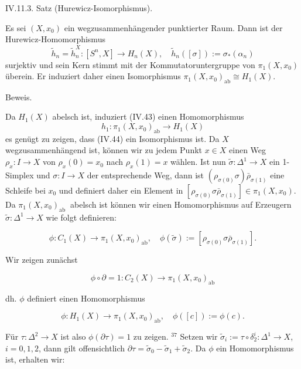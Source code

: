 \documentclass[10pt, letterpaper]{article}
\begin{document}
IV.11.3. Satz (Hurewicz-Isomorphismus). 

Es sei $(X, x_0)$ ein wegzusammenhängender punktierter Raum. Dann ist der Hurewicz-Homomorphismus 
$$\tilde{h}_n=\tilde{h}_n^X:\left[S^n, X\right] \rightarrow H_n(X), \quad \tilde{h}_n([\sigma]):=\sigma_*\left(\alpha_n\right)$$
surjektiv und sein Kern stimmt mit der Kommutatoruntergruppe von $\pi_1\left(X, x_0\right)$ überein. Er induziert daher einen Isomorphismus $\pi_1\left(X, x_0\right)_{\mathrm{ab}} \cong H_1(X)$.


Beweis. 

Da $H_1(X)$ abelsch ist, induziert (IV.43) einen Homomorphismus
$$
h_1: \pi_1\left(X, x_0\right)_{\mathrm{ab}} \rightarrow H_1(X)
$$
es genügt zu zeigen, dass (IV.44) ein Isomorphismus ist. Da $X$ wegzusammenhängend ist, können wir zu jedem Punkt $x \in X$ einen Weg $\rho_x: I \rightarrow X$ von $\rho_x(0)=x_0$ nach $\rho_x(1)=x$ wählen. Ist nun $\tilde{\sigma}: \Delta^1 \rightarrow X$ ein 1-Simplex und $\sigma: I \rightarrow X$ der entsprechende Weg, dann ist $\left(\rho_{\sigma(0)} \sigma\right) \bar{\rho}_{\sigma(1)}$ eine Schleife bei $x_0$ und definiert daher ein Element in $\left[\rho_{\sigma(0)} \sigma \bar{\rho}_{\sigma(1)}\right] \in \pi_1\left(X, x_0\right)$. Da $\pi_1\left(X, x_0\right)_{\text {ab }}$ abelsch ist können wir einen Homomorphismus auf Erzeugern $\tilde{\sigma}: \Delta^1 \rightarrow X$ wie folgt definieren:

$$
\phi: C_1(X) \rightarrow \pi_1\left(X, x_0\right)_{\mathrm{ab}}, \quad \phi(\tilde{\sigma}):=\left[\rho_{\sigma(0)} \sigma \bar{\rho}_{\sigma(1)}\right] .
$$


Wir zeigen zunächst

$$
\phi \circ \partial=1: C_2(X) \rightarrow \pi_1\left(X, x_0\right)_{\mathrm{ab}}
$$

dh. $\phi$ definiert einen Homomorphismus

$$
\phi: H_1(X) \rightarrow \pi_1\left(X, x_0\right)_{\mathrm{ab}}, \quad \phi([c]):=\phi(c) .
$$


Für $\tau: \Delta^2 \rightarrow X$ ist also $\phi(\partial \tau)=1$ zu zeigen. ${ }^{37}$ Setzen wir $\tilde{\sigma}_i:=\tau \circ \delta_2^i: \Delta^1 \rightarrow X$, $i=0,1,2$, dann gilt offensichtlich $\partial \tau=\tilde{\sigma}_0-\tilde{\sigma}_1+\tilde{\sigma}_2$. Da $\phi$ ein Homomorphismus ist, erhalten wir:
\end{document}
